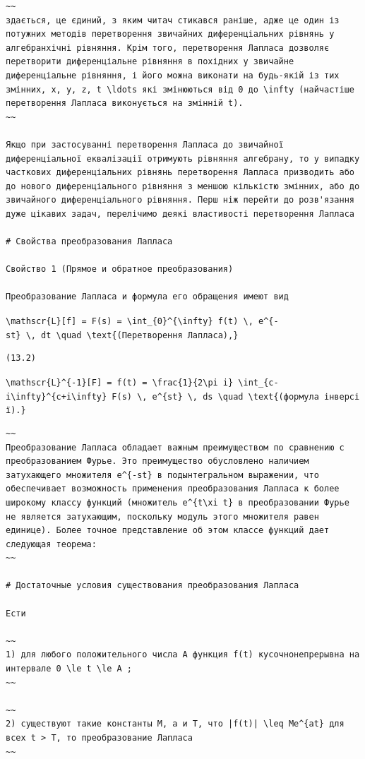 \documentclass[
  ukrainian,
]{article}
\begin{document}
\begin{verbatim}
~~
здається, це єдиний, з яким читач стикався раніше, адже це один із потужних методів перетворення звичайних диференціальних рівнянь у алгебранхічні рівняння. Крім того, перетворення Лапласа дозволяє перетворити диференціальне рівняння в похідних у звичайне диференціальне рівняння, і його можна виконати на будь-якій із тих змінних, x, y, z, t \ldots які змінюються від 0 до \infty (найчастіше перетворення Лапласа виконується на змінній t).
~~

Якщо при застосуванні перетворення Лапласа до звичайної диференціальної еквалізації отримують рівняння алгебрану, то у випадку часткових диференціальних рівнянь перетворення Лапласа призводить або до нового диференціального рівняння з меншою кількістю змінних, або до звичайного диференціального рівняння. Перш ніж перейти до розв'язання дуже цікавих задач, перелічимо деякі властивості перетворення Лапласа

# Свойства преобразования Лапласа

Свойство 1 (Прямое и обратное преобразования)

Преобразование Лапласа и формула его обращения имеют вид
\end{verbatim}

\texttt{\textbackslash{}mathscr\{L\}{[}f{]}\ =\ F(s)\ =\ \textbackslash{}int\_\{0\}\^{}\{\textbackslash{}infty\}\ f(t)\ \textbackslash{},\ e\^{}\{-st\}\ \textbackslash{},\ dt\ \textbackslash{}quad\ \textbackslash{}text\{(Перетворення\ Лапласа),\}}

\begin{verbatim}
(13.2)
\end{verbatim}

\texttt{\textbackslash{}mathscr\{L\}\^{}\{-1\}{[}F{]}\ =\ f(t)\ =\ \textbackslash{}frac\{1\}\{2\textbackslash{}pi\ i\}\ \textbackslash{}int\_\{c-i\textbackslash{}infty\}\^{}\{c+i\textbackslash{}infty\}\ F(s)\ \textbackslash{},\ e\^{}\{st\}\ \textbackslash{},\ ds\ \textbackslash{}quad\ \textbackslash{}text\{(формула\ інверсії).\}}

\begin{verbatim}
~~
Преобразование Лапласа обладает важным преимуществом по сравнению с преобразованием Фурье. Это преимущество обусловлено наличием затухающего множителя e^{-st} в подынтегральном выражении, что обеспечивает возможность применения преобразования Лапласа к более широкому классу функций (множитель e^{t\xi t} в преобразовании Фурье не является затухающим, поскольку модуль этого множителя равен единице). Более точное представление об этом классе функций дает следующая теорема:
~~

# Достаточные условия существования преобразования Лапласа

Ести

~~
1) для любого положительного числа A функция f(t) кусочнонепрерывна на интервале 0 \le t \le A ;
~~

~~
2) существуют такие константы M, a и T, что |f(t)| \leq Me^{at} для всех t > T, то преобразование Лапласа
~~
\end{verbatim}
\end{document}
